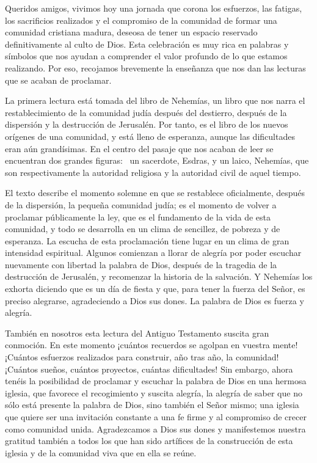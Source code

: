 Queridos amigos, vivimos hoy una jornada que corona los esfuerzos, las
fatigas, los sacrificios realizados y el compromiso de la comunidad de
formar una comunidad cristiana madura, deseosa de tener un espacio
reservado definitivamente al culto de Dios. Esta celebración es muy rica
en palabras y símbolos que nos ayudan a comprender el valor profundo de
lo que estamos realizando. Por eso, recojamos brevemente la enseñanza
que nos dan las lecturas que se acaban de proclamar.

La primera lectura está tomada del libro de Nehemías, un libro que nos
narra el restablecimiento de la comunidad judía después del destierro,
después de la dispersión y la destrucción de Jerusalén. Por tanto, es el
libro de los nuevos orígenes de una comunidad, y está lleno de
esperanza, aunque las dificultades eran aún grandísimas. En el centro
del pasaje que nos acaban de leer se encuentran dos grandes figuras:~ un
sacerdote, Esdras, y un laico, Nehemías, que son respectivamente la
autoridad religiosa y la autoridad civil de aquel tiempo.

El texto describe el momento solemne en que se restablece oficialmente,
después de la dispersión, la pequeña comunidad judía; es el momento de
volver a proclamar públicamente la ley, que es el fundamento de la vida
de esta comunidad, y todo se desarrolla en un clima de sencillez, de
pobreza y de esperanza. La escucha de esta proclamación tiene lugar en
un clima de gran intensidad espiritual. Algunos comienzan a llorar de
alegría por poder escuchar nuevamente con libertad la palabra de Dios,
después de la tragedia de la destrucción de Jerusalén, y recomenzar la
historia de la salvación. Y Nehemías los exhorta diciendo que es un día
de fiesta y que, para tener la fuerza del Señor, es preciso alegrarse,
agradeciendo a Dios sus dones. La palabra de Dios es fuerza y alegría.

También en nosotros esta lectura del Antiguo Testamento suscita gran
conmoción. En este momento ¡cuántos recuerdos se agolpan en vuestra
mente! ¡Cuántos esfuerzos realizados para construir, año tras año, la
comunidad! ¡Cuántos sueños, cuántos proyectos, cuántas dificultades! Sin
embargo, ahora tenéis la posibilidad de proclamar y escuchar la palabra
de Dios en una hermosa iglesia, que favorece el recogimiento y suscita
alegría, la alegría de saber que no sólo está presente la palabra de
Dios, sino también el Señor mismo; una iglesia que quiere ser una
invitación constante a una fe firme y al compromiso de crecer como
comunidad unida. Agradezcamos a Dios sus dones y manifestemos nuestra
gratitud también a todos los que han sido artífices de la construcción
de esta iglesia y de la comunidad viva que en ella se reúne.

